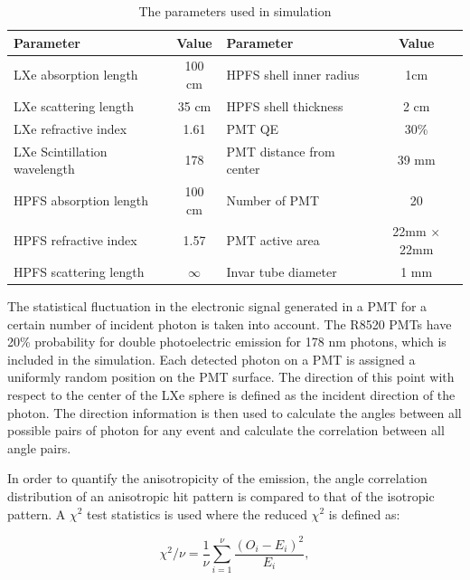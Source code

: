 \begin{table}[h]
  \centering
  \caption{The parameters used in simulation}
  \label{tab:OptPar}
  \begin{tabular}{|l c||l c|}
  \hline
  Parameter & Value & Parameter & Value \\
  \hline
  LXe absorption length & 100 cm & HPFS shell inner radius & 1cm \\
  LXe scattering length & 35 cm & HPFS shell thickness & 2 cm\\
  LXe refractive index & 1.61  & PMT QE &  30\% \\
  LXe Scintillation wavelength & 178& PMT distance from center & 39 mm\\
  HPFS absorption length & 100 cm  & Number of PMT & 20 \\
  HPFS refractive index & 1.57 & PMT active area & 22mm $\times$ 22mm \\
  HPFS scattering length & $\infty$ & Invar tube diameter & 1 mm\\
  \hline
 \end{tabular}
\end{table}


The statistical fluctuation 
in the electronic signal generated in a PMT for a certain number of incident photon is 
taken into account. The R8520 PMTs have 20\% probability 
for double photoelectric emission for 178 nm photons, which is included in the simulation.
Each detected photon on a PMT is assigned a uniformly random position on the PMT surface. 
The direction of this point with respect 
to the center of the LXe sphere is defined as the incident direction of the photon. The direction information 
is then used to calculate the angles between all possible pairs of photon for any event and 
calculate the correlation between all angle pairs. 

In order to quantify the anisotropicity of the emission, 
the angle correlation distribution of an anisotropic hit pattern is compared to that of the isotropic 
pattern. A $\chi^2$ test statistics is used where the reduced $\chi^2$ is defined as: 

\begin{equation}
\chi^2/\nu = \frac{1}{\nu} \sum^{\nu}_{i=1} \frac{(O_i - E_i)^2}{E_i},
\label{redchi2}
\end{equation}

